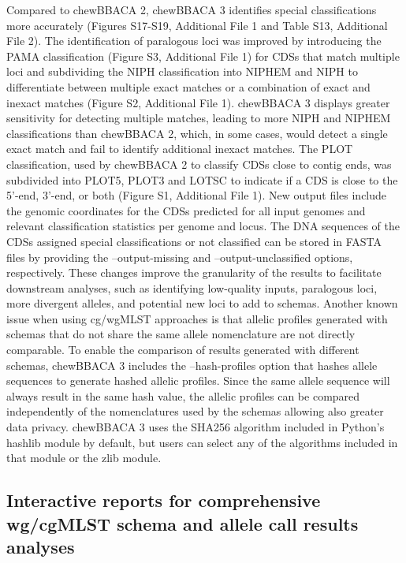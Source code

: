 Compared to chewBBACA 2, chewBBACA 3 identifies special classifications more accurately (Figures S17-S19, Additional File 1 and Table S13, Additional File 2). The identification of paralogous loci was improved by introducing the PAMA classification (Figure S3, Additional File 1) for CDSs that match multiple loci and subdividing the NIPH classification into NIPHEM and NIPH to differentiate between multiple exact matches or a combination of exact and inexact matches (Figure S2, Additional File 1). chewBBACA 3 displays greater sensitivity for detecting multiple matches, leading to more NIPH and NIPHEM classifications than chewBBACA 2, which, in some cases, would detect a single exact match and fail to identify additional inexact matches. The PLOT classification, used by chewBBACA 2 to classify CDSs close to contig ends, was subdivided into PLOT5, PLOT3 and LOTSC to indicate if a CDS is close to the 5'-end, 3'-end, or both (Figure S1, Additional File 1). New output files include the genomic coordinates for the CDSs predicted for all input genomes and relevant classification statistics per genome and locus. The DNA sequences of the CDSs assigned special classifications or not classified can be stored in FASTA files by providing the --output-missing and --output-unclassified options, respectively. These changes improve the granularity of the results to facilitate downstream analyses, such as identifying low-quality inputs, paralogous loci, more divergent alleles, and potential new loci to add to schemas.
Another known issue when using cg/wgMLST approaches is that allelic profiles generated with schemas that do not share the same allele nomenclature are not directly comparable. To enable the comparison of results generated with different schemas, chewBBACA 3 includes the --hash-profiles option that hashes allele sequences to generate hashed allelic profiles. Since the same allele sequence will always result in the same hash value, the allelic profiles can be compared independently of the nomenclatures used by the schemas allowing also greater data privacy. chewBBACA 3 uses the SHA256 algorithm included in Python’s hashlib module by default, but users can select any of the algorithms included in that module or the zlib module.

\subsection{Interactive reports for comprehensive wg/cgMLST schema and allele call results analyses} \label{ssec:results_discussion_ssec4}

